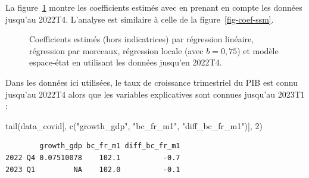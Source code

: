 \documentclass[
  a4paper,
  DIV=11,
  numbers=noendperiod,
  french]{scrartcl}
\newenvironment{Shaded}{\begin{snugshade}}{\end{snugshade}}
\newcommand{\DecValTok}[1]{\textcolor[rgb]{0.68,0.00,0.00}{#1}}
\newcommand{\FunctionTok}[1]{\textcolor[rgb]{0.28,0.35,0.67}{#1}}
\newcommand{\NormalTok}[1]{\textcolor[rgb]{0.00,0.23,0.31}{#1}}
\newcommand{\StringTok}[1]{\textcolor[rgb]{0.13,0.47,0.30}{#1}}
\newcommand\1{{\mathds 1}}
\theoremstyle{remark}
\begin{document}
La figure~\ref{fig-coef-covid} montre les coefficients estimés avec en
prenant en compte les données jusqu'au 2022T4. L'analyse est similaire à
celle de la figure~\ref{fig-coef-ssm}.

\begin{figure}

\caption{\label{fig-coef-covid}Coefficients estimés (hors indicatrices)
par régression linéaire, régression par morceaux, régression locale
(avec \(b=0,75\)) et modèle espace-état en utilisant les données
jusqu'en 2022T4.}


\end{figure}%

Dans les données ici utilisées, le taux de croissance trimestriel du PIB
est connu jusqu'au 2022T4 alors que les variables explicatives sont
connues jusqu'au 2023T1 :

\begin{Shaded}
\begin{Highlighting}[]
\FunctionTok{tail}\NormalTok{(data\_covid[, }\FunctionTok{c}\NormalTok{(}\StringTok{"growth\_gdp"}\NormalTok{, }\StringTok{"bc\_fr\_m1"}\NormalTok{, }\StringTok{"diff\_bc\_fr\_m1"}\NormalTok{)], }\DecValTok{2}\NormalTok{)}
\end{Highlighting}
\end{Shaded}

\begin{verbatim}
        growth_gdp bc_fr_m1 diff_bc_fr_m1
2022 Q4 0.07510078    102.1          -0.7
2023 Q1         NA    102.0          -0.1
\end{verbatim}
\end{document}
